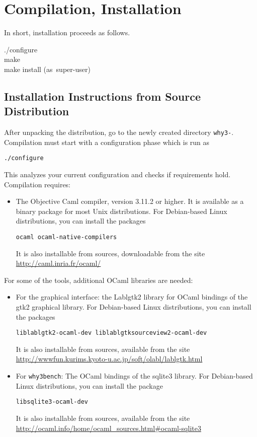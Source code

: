
\chapter{Compilation, Installation}
\label{sec:install}


In short, installation proceeds as follows.
\begin{flushleft}\ttfamily
  ./configure\\
  make\\
  make install \mbox{\rmfamily (as super-user)}
\end{flushleft}

\section{Installation Instructions from Source Distribution}

After unpacking the distribution, go to the newly created directory
\texttt{why3-\whyversion}. Compilation must start with a
configuration phase which is run as 
\begin{verbatim}
./configure
\end{verbatim}
This analyzes your current configuration and checks if requirements hold.
Compilation requires:
\begin{itemize}
\item The Objective Caml compiler, version 3.11.2 or higher. It is
  available as a binary package for most Unix distributions. For
  Debian-based Linux distributions, you can install the packages
\begin{verbatim}
ocaml ocaml-native-compilers
\end{verbatim}
It is also installable from sources, downloadable from the site
\url{http://caml.inria.fr/ocaml/}
\end{itemize}

\noindent
For some of the \why tools, additional OCaml libraries are needed:
\begin{itemize}
\item For the graphical interface: the Lablgtk2 library for OCaml
  bindings of the gtk2 graphical library. For Debian-based Linux
  distributions, you can install the packages
\begin{verbatim}
liblablgtk2-ocaml-dev liblablgtksourceview2-ocaml-dev
\end{verbatim}
It is also installable from sources, available from the site
\url{http://wwwfun.kurims.kyoto-u.ac.jp/soft/olabl/lablgtk.html}

\item For \texttt{why3bench}: The OCaml bindings of the sqlite3 library.
For Debian-based Linux distributions, you can install the package
\begin{verbatim}
libsqlite3-ocaml-dev
\end{verbatim}
It is also installable from sources, available from the site
\url{http://ocaml.info/home/ocaml_sources.html#ocaml-sqlite3}
\end{itemize}

